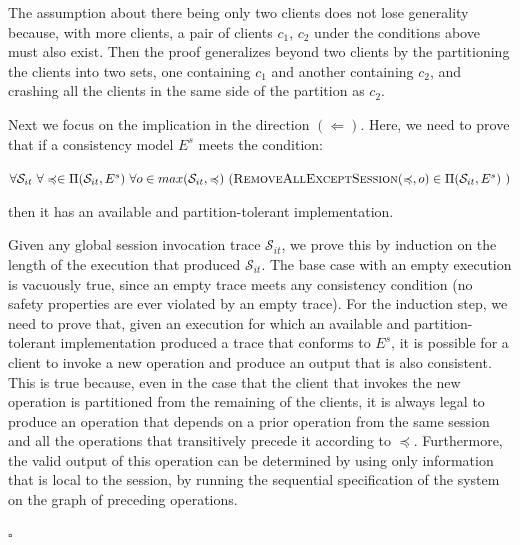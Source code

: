 \documentclass[acmlarge, ,11pt]{acmart}
\begin{document}
The assumption about there being only two clients does not lose generality because, with more clients, a pair of clients $c_1$, $c_2$ under the conditions above must also exist. Then the proof generalizes beyond two clients by the partitioning the clients into two sets, one containing $c_1$ and another containing $c_2$, and crashing all the clients in the same side of the partition as $c_2$.

Next we focus on the implication in the direction $(\Leftarrow)$. Here, we need to prove that if a consistency model $E^s$ meets the condition:

\noindent $\forall \mathcal{S}_{it} ~ \forall \preccurlyeq \in \Pi(\mathcal{S}_{it},E^s) ~ \forall o \in max(\mathcal{S}_{it}, \preccurlyeq) ~ (\textsc{RemoveAllExceptSession}(\preccurlyeq,o) \in \Pi(\mathcal{S}_{it},E^s) ~ ) $

then it has an available and partition-tolerant implementation.



Given any global session invocation trace $\mathcal{S}_{it}$, we prove this by induction on the length of the execution that produced $\mathcal{S}_{it}$. The base case with an empty execution is vacuously true, since an empty trace meets any consistency condition (no safety properties are ever violated by an empty trace). For the induction step, we need to prove that, given an execution for which an available and partition-tolerant implementation produced a trace that conforms to $E^s$, it is possible for a client to invoke a new operation and produce an output that is also consistent. This is true because, even in the case that the client that invokes the new operation is partitioned from the remaining of the clients, it is always legal to produce an operation that depends on a prior operation from the same session and all the operations that transitively precede it according to $\preccurlyeq$. Furthermore, the valid output of this operation can be determined by using only information that is local to the session, by running the sequential specification of the system on the graph of preceding operations.

\begin{flushright}
$\square$
\end{flushright}
\end{document}
